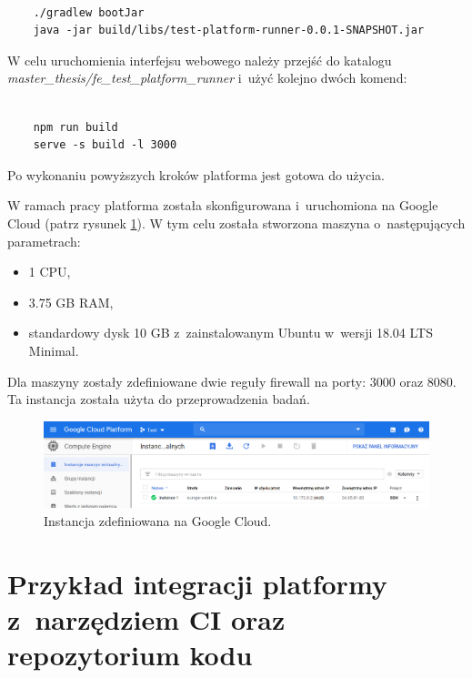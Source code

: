 {\selectfont
\tiny
\begin{lstlisting}

    ./gradlew bootJar
    java -jar build/libs/test-platform-runner-0.0.1-SNAPSHOT.jar

\end{lstlisting}
}

W celu uruchomienia interfejsu webowego należy przejść do katalogu \newline \textit{master\_thesis/fe\_test\_platform\_runner} i~użyć kolejno dwóch komend:

{\selectfont
\tiny
\begin{lstlisting}

    npm run build
    serve -s build -l 3000

\end{lstlisting}
}

Po wykonaniu powyższych kroków platforma jest gotowa do użycia.

W ramach pracy platforma została skonfigurowana i~uruchomiona na Google Cloud (patrz rysunek \ref{fig:google_cloud}).
W tym celu została stworzona maszyna o~następujących parametrach:
\begin{itemize}
    \item 1 CPU,
    \item 3.75 GB RAM,
    \item standardowy dysk 10 GB z~zainstalowanym Ubuntu w~wersji 18.04 LTS Minimal.
\end{itemize}
Dla maszyny zostały zdefiniowane dwie reguły firewall na porty: 3000 oraz 8080.
Ta instancja została użyta do przeprowadzenia badań.

\begin{figure}[h]
    \centering
    \includegraphics[width = 16cm]{chapter05/google_cloud.png}
    \caption{Instancja zdefiniowana na Google Cloud.}
    \label{fig:google_cloud}
\end{figure}

\section {Przykład integracji platformy z~narzędziem CI oraz repozytorium kodu}
\label{ci-integration}

